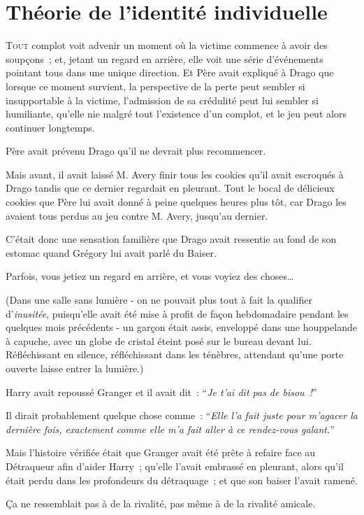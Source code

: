 \chapter{Théorie de l'identité individuelle}

\lettrine{T}{out} complot voit advenir un moment où la victime commence à avoir des soupçons~; et, jetant un regard en arrière, elle voit une série d'événements pointant tous dans une unique direction. Et Père avait expliqué à Drago que lorsque ce moment survient, la perspective de la perte peut sembler si insupportable à la victime, l'admission de sa crédulité peut lui sembler si humiliante, qu'elle nie malgré tout l'existence d'un complot, et le jeu peut alors continuer longtemps.

Père avait prévenu Drago qu'il ne devrait plus recommencer.

Mais avant, il avait laissé M. Avery finir tous les cookies qu'il avait escroqués à Drago tandis que ce dernier regardait en pleurant. Tout le bocal de délicieux cookies que Père lui avait donné à peine quelques heures plus tôt, car Drago les avaient tous perdus au jeu contre M. Avery, jusqu'au dernier.

C'était donc une sensation familière que Drago avait ressentie au fond de son estomac quand Grégory lui avait parlé du Baiser.

Parfois, vous jetiez un regard en arrière, et vous voyiez des choses…

(Dans une salle sans lumière - on ne pouvait plus tout à fait la qualifier d'\emph{inusitée}, puisqu'elle avait été mise à profit de façon hebdomadaire pendant les quelques mois précédents - un garçon était assis, enveloppé dans une houppelande à capuche, avec un globe de cristal éteint posé sur le bureau devant lui. Réfléchissant en silence, réfléchissant dans les ténèbres, attendant qu'une porte ouverte laisse entrer la lumière.)

Harry avait repoussé Granger et il avait dit~: “\emph{Je t'ai dit pas de bisou~!}”

Il dirait probablement quelque chose comme~: “\emph{Elle l'a fait juste pour m'agacer la dernière fois, exactement comme elle m'a fait aller à ce rendez-vous galant.}”

Mais l'histoire vérifiée était que Granger avait été prête à refaire face au Détraqueur afin d'aider Harry~; qu'elle l'avait embrassé en pleurant, alors qu'il était perdu dans les profondeurs du détraquage~; et que son baiser l'avait ramené.

Ça ne ressemblait pas à de la rivalité, pas même à de la rivalité amicale.

